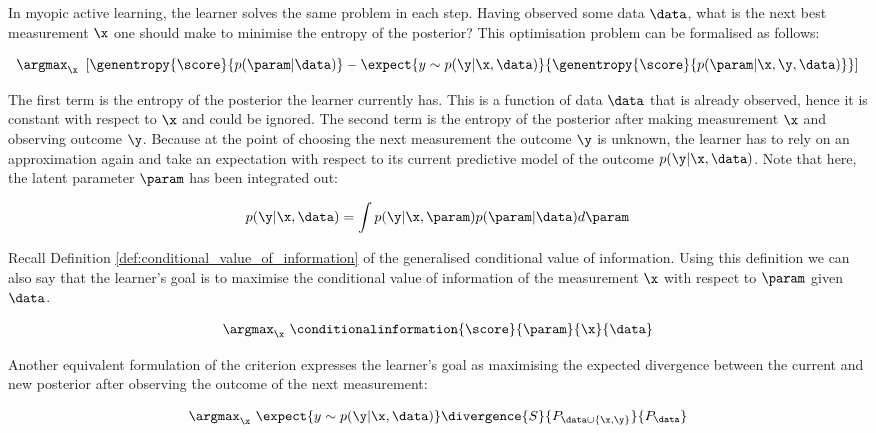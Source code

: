 In myopic active learning, the learner solves the same problem in each step. Having observed some data $\data$, what is the next best measurement $\x$ one should make to minimise the entropy of the posterior? This optimisation problem can be formalised as follows:

\begin{equation}
	\argmax_\x\ \left[ \genentropy{\score}{p(\param\vert\data)} - \expect{y\sim p(\y\vert \x, \data)}{\genentropy{\score}{p(\param\vert \x,\y,\data)} }\right ]
	\label{eqn:active_learning_optimisation_criterion}
\end{equation}

The first term is the entropy of the posterior the learner currently has. This is a function of data $\data$ that is already observed, hence it is constant with respect to $\x$ and could be ignored. The second term is the entropy of the posterior after making measurement $\x$ and observing outcome $\y$. Because at the point of choosing the next measurement the outcome $\y$ is unknown, the learner has to rely on an approximation again and take an expectation with respect to its current predictive model of the outcome $p(\y \vert \x, \data)$. Note that here, the latent parameter $\param$ has been integrated out:

\begin{equation}
	p(\y \vert \x, \data) = \int p(\y \vert \x, \param) p(\param \vert \data) d\param
\end{equation}

Recall Definition \ref{def:conditional_value_of_information} of the generalised conditional value of information. Using this definition we can also say that the learner's goal is to maximise the conditional value of information of the measurement $\x$ with respect to $\param$ given $\data$.

\begin{equation}
	\argmax_\x\ \conditionalinformation{\score}{\param}{\x}{\data}
\end{equation}

Another equivalent formulation of the criterion expresses the learner's goal as maximising the expected divergence between the current and new posterior after observing the outcome of the next measurement:

\begin{equation}
	\argmax_\x\  \expect{y \sim p(\y\vert \x, \data)}\divergence{S}{P_{\data\cup\{\x,\y\}}}{P_{\data}}
	\label{eqn:active_learning_maximise_divergence}
\end{equation}


